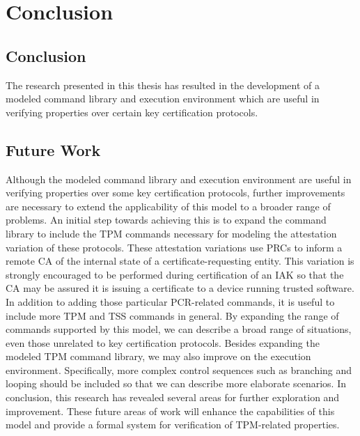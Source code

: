 \chapter{Conclusion}


\section{Conclusion}


The research presented in this thesis has resulted in the development of a modeled command library and execution environment which are useful in verifying properties over certain key certification protocols.


\section{Future Work}

Although the modeled command library and execution environment are useful in verifying properties over some key certification protocols, further improvements are necessary to extend the applicability of this model to a broader range of problems. An initial step towards achieving this is to expand the command library to include the TPM commands necessary for modeling the attestation variation of these protocols. These attestation variations use PRCs to inform a remote CA of the internal state of a certificate-requesting entity. This variation is strongly encouraged to be performed during certification of an IAK so that the CA may be assured it is issuing a certificate to a device running trusted software. In addition to adding those particular PCR-related commands, it is useful to include more TPM and TSS commands in general. By expanding the range of commands supported by this model, we can describe a broad range of situations, even those unrelated to key certification protocols.  Besides expanding the modeled TPM command library, we may also improve on the execution environment. Specifically, more complex control sequences such as branching and looping should be included so that we can describe more elaborate scenarios.  In conclusion, this research has revealed several areas for further exploration and improvement. These future areas of work will enhance the capabilities of this model and provide a formal system for verification of TPM-related properties.
